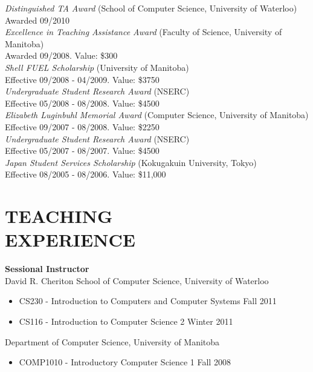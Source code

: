 \documentclass[line,margin]{res}
\begin{document}
\begin{resume}
{\sl Distinguished TA Award} (School of Computer Science, University of Waterloo) \\
\hspace*{1cm} Awarded 09/2010 \vspace{3pt} \\
{\sl Excellence in Teaching Assistance Award} (Faculty of Science, University of Manitoba) \\
\hspace*{1cm} Awarded 09/2008. Value: \$300 \vspace{3pt} \\
{\sl Shell FUEL Scholarship} (University of Manitoba) \\
\hspace*{1cm} Effective 09/2008 - 04/2009. Value: \$3750 \vspace{3pt} \\
{\sl Undergraduate Student Research Award} (NSERC) \\
\hspace*{1cm} Effective 05/2008 - 08/2008. Value: \$4500 \vspace{3pt} \\
{\sl Elizabeth Luginbuhl Memorial Award} (Computer Science, University of Manitoba) \\
\hspace*{1cm} Effective 09/2007 - 08/2008. Value: \$2250 \vspace{3pt} \\
{\sl Undergraduate Student Research Award} (NSERC) \\
\hspace*{1cm} Effective 05/2007 - 08/2007. Value: \$4500 \vspace{3pt} \\
{\sl Japan Student Services Scholarship} (Kokugakuin University, Tokyo) \\
\hspace*{1cm} Effective 08/2005 - 08/2006. Value: \$11,000

\clearpage

\section{TEACHING \\EXPERIENCE}
  {\bf Sessional Instructor} \vspace{4pt} \\
  David R. Cheriton School of Computer Science, University of Waterloo
  \begin{itemize}  \itemsep -2pt %
    \item CS230 - Introduction to Computers and Computer Systems \hfill Fall 2011
    \item CS116 - Introduction to Computer Science 2 \hfill Winter 2011
  \end{itemize} \vspace{-8pt}
  Department of Computer Science, University of Manitoba
  \begin{itemize}  \itemsep -2pt %
    \item COMP1010 - Introductory Computer Science 1 \hfill Fall 2008
  \end{itemize}
  

\end{resume}
\end{document}
